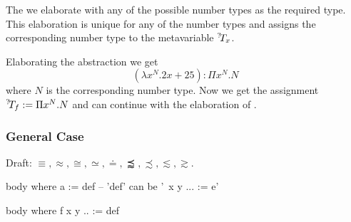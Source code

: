 The we elaborate  with any of the possible number types as the
required type. This elaboration is unique for any of the number types and
assigns the corresponding number type to the metavariable ${}^?\!T_x$.

Elaborating the abstraction we get
$$
    (\lambda x^N. 2x + 25): \Pi x^N. N
$$
where $N$ is the corresponding number type. Now we get the assignment ${}^?\!T_f
:= \Pi x^N. N$ and can continue with the elaboration of .


\vskip 5mm
\subsubsection{General Case}

Draft: $\equiv, \approx, \cong, \simeq, \doteq, \precapprox, \precsim, \lesssim,
\gtrsim$.



\begin{alba}
    body
    where
        a := def   -- 'def' can be '\ x y ... := e'

    body
    where
        f x y .. := def
\end{alba}
